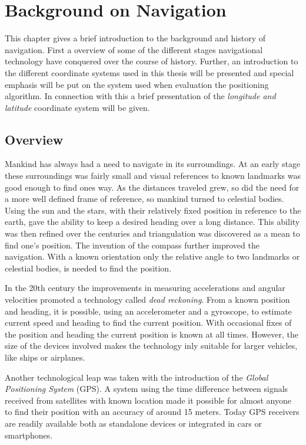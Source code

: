 \documentclass{LTHthesis}
\begin{document}
\chapter{Background on Navigation}
\label{chap:background}
%
This chapter gives a brief introduction to the background and history of navigation. First a overview of some of the different stages navigational technology have conquered over the course of history. Further, an introduction to the different coordinate systems used in this thesis will be presented and special emphasis will be put on the system used when evaluation the positioning algorithm. In connection with this a brief presentation of the \emph{longitude and latitude} coordinate system will be given. 
%
\section{Overview}
%
Mankind has always had a need to navigate in its surroundings. At an early stage these surroundings was fairly small and visual references to known landmarks was good enough to find ones way. As the distances traveled grew, so did the need for a more well defined frame of reference, so mankind turned to celestial bodies. Using the sun and the stars, with their relatively fixed position in reference to the earth, gave the ability to keep a desired heading over a long distance. This ability was then refined over the centuries and triangulation was discovered as a mean to find one's position. The invention of the compass further improved the navigation. With a known orientation only the relative angle to two landmarks or celestial bodies, is needed to find the position. 

In the 20th century the improvements in measuring accelerations and angular velocities promoted a technology called \emph{dead reckoning}. From a known position and heading, it is possible, using an accelerometer and a gyroscope, to estimate current speed and heading to find the current position. With occasional fixes of the position and heading the current position is known at all times. However, the size of the devices involved makes the technology inly suitable for larger vehicles, like ships or airplanes.

Another technological leap was taken with the introduction of the \emph{Global Positioning System} (GPS). A system using the time difference between signals received from satellites with known location made it possible for almost anyone to find their position with an accuracy of around 15 meters. Today GPS receivers are readily available both as standalone devices or integrated in cars or smartphones.
\end{document}
